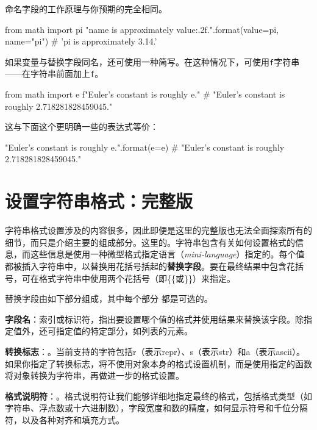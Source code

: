 命名字段的工作原理与你预期的完全相同。
\begin{pyc}
from math import pi
"{name} is approximately {value:.2f}.".format(value=pi, name="pi")
# 'pi is approximately 3.14.'
\end{pyc}

如果变量与替换字段同名，还可使用一种简写。在这种情况下，可使用\verb|f|字符串——在字符串前面加上\verb|f|。
\begin{pyc}
from math import e
f"Euler's constant is roughly {e}."
# "Euler's constant is roughly 2.718281828459045."
\end{pyc}

这与下面这个更明确一些的表达式等价：
\begin{pyc}
"Euler's constant is roughly {e}.".format(e=e)
# "Euler's constant is roughly 2.718281828459045."
\end{pyc}

\section{设置字符串格式：完整版}
字符串格式设置涉及的内容很多，因此即便是这里的完整版也无法全面探索所有的细节，而只是介绍主要的组成部分。这里的。字符串包含有关如何设置格式的信息，而这些信息是使用一种微型格式指定语言（\emph{mini-language}）指定的。每个值都被插入字符串中，以替换用花括号括起的\textbf{替换字段}。要在最终结果中包含花括号，可在格式字符串中使用两个花括号（即\{\{或\}\}）来指定。

替换字段由如下部分组成，其中每个部分
都是可选的。
\begin{dinglist}{43}
    \item \textbf{字段名}：索引或标识符，指出要设置哪个值的格式并使用结果来替换该字段。除指定值外，还可指定值的特定部分，如列表的元素。
    \item \textbf{转换标志}：。当前支持的字符包括r（表示repr）、s（表示str）和a（表示ascii）。如果你指定了转换标志，将不使用对象本身的格式设置机制，而是使用指定的函数将对象转换为字符串，再做进一步的格式设置。
    \item \textbf{格式说明符}：。格式说明符让我们能够详细地指定最终的格式，包括格式类型（如字符串、浮点数或十六进制数），字段宽度和数的精度，如何显示符号和千位分隔符，以及各种对齐和填充方式。
\end{dinglist}
